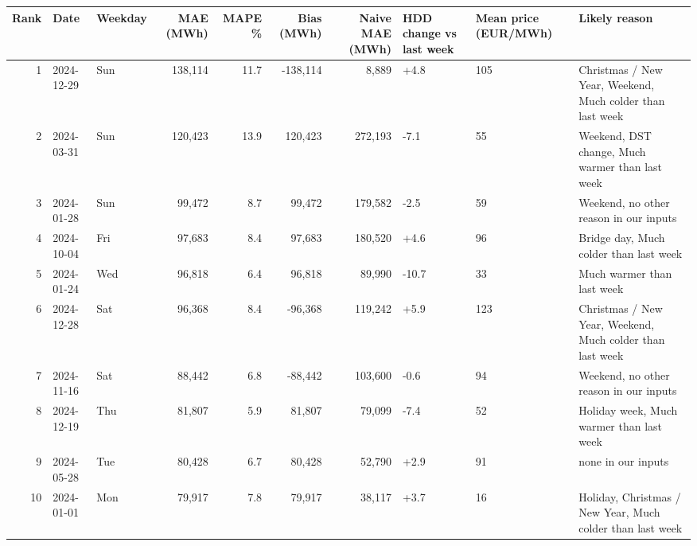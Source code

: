 \begin{tabular}{rllrrrrlll}
\toprule
Rank & Date & Weekday & MAE (MWh) & MAPE \% & Bias (MWh) & Naive MAE (MWh) & HDD change vs last week & Mean price (EUR/MWh) & Likely reason \\
\midrule
1 & 2024-12-29 & Sun & 138,114 & 11.7 & -138,114 & 8,889 & +4.8 & 105 & Christmas / New Year, Weekend, Much colder than last week \\
2 & 2024-03-31 & Sun & 120,423 & 13.9 & 120,423 & 272,193 & -7.1 & 55 & Weekend, DST change, Much warmer than last week \\
3 & 2024-01-28 & Sun & 99,472 & 8.7 & 99,472 & 179,582 & -2.5 & 59 & Weekend, no other reason in our inputs \\
4 & 2024-10-04 & Fri & 97,683 & 8.4 & 97,683 & 180,520 & +4.6 & 96 & Bridge day, Much colder than last week \\
5 & 2024-01-24 & Wed & 96,818 & 6.4 & 96,818 & 89,990 & -10.7 & 33 & Much warmer than last week \\
6 & 2024-12-28 & Sat & 96,368 & 8.4 & -96,368 & 119,242 & +5.9 & 123 & Christmas / New Year, Weekend, Much colder than last week \\
7 & 2024-11-16 & Sat & 88,442 & 6.8 & -88,442 & 103,600 & -0.6 & 94 & Weekend, no other reason in our inputs \\
8 & 2024-12-19 & Thu & 81,807 & 5.9 & 81,807 & 79,099 & -7.4 & 52 & Holiday week, Much warmer than last week \\
9 & 2024-05-28 & Tue & 80,428 & 6.7 & 80,428 & 52,790 & +2.9 & 91 & none in our inputs \\
10 & 2024-01-01 & Mon & 79,917 & 7.8 & 79,917 & 38,117 & +3.7 & 16 & Holiday, Christmas / New Year, Much colder than last week \\
\bottomrule
\end{tabular}
